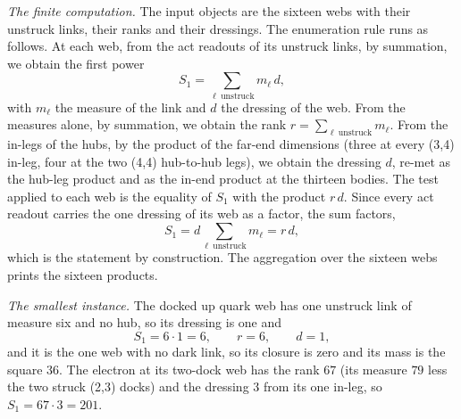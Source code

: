 \begin{chproof}
\textit{The finite computation.} The input objects are the sixteen webs with their unstruck links, their ranks and their dressings. The enumeration rule runs as follows. At each web, from the act readouts of its unstruck links, by summation, we obtain the first power
\begin{equation}
S_1=\sum_{\ell\ \mathrm{unstruck}} m_\ell\, d ,
\end{equation}
with $m_\ell$ the measure of the link and $d$ the dressing of the web. From the measures alone, by summation, we obtain the rank $r=\sum_{\ell\ \mathrm{unstruck}} m_\ell$. From the in-legs of the hubs, by the product of the far-end dimensions (three at every (3,4) in-leg, four at the two (4,4) hub-to-hub legs), we obtain the dressing $d$, re-met as the hub-leg product and as the in-end product at the thirteen bodies. The test applied to each web is the equality of $S_1$ with the product $r\,d$. Since every act readout carries the one dressing of its web as a factor, the sum factors,
\begin{equation}
S_1=d\sum_{\ell\ \mathrm{unstruck}} m_\ell = r\,d ,
\end{equation}
which is the statement by construction. The aggregation over the sixteen webs prints the sixteen products.

\textit{The smallest instance.} The docked up quark web has one unstruck link of measure six and no hub, so its dressing is one and
\begin{equation}
S_1 = 6\cdot 1 = 6,\qquad r=6,\qquad d=1 ,
\end{equation}
and it is the one web with no dark link, so its closure is zero and its mass is the square $36$. The electron at its two-dock web has the rank $67$ (its measure $79$ less the two struck (2,3) docks) and the dressing $3$ from its one in-leg, so $S_1=67\cdot 3=201$.


\end{chproof}
